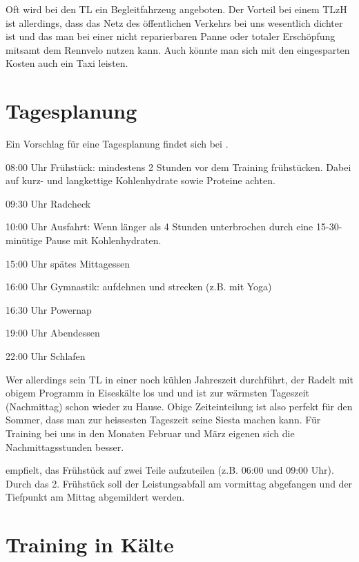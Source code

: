 \documentclass[a4paper,DIV13,BCOR0cm]{scrartcl}
\newcommand{\rv}{Rennvelo}
\newcommand{\tlzh}{TLzH}
\begin{document}
Oft wird bei den TL ein Begleitfahrzeug angeboten.
Der Vorteil bei einem \tlzh{} ist allerdings, dass das Netz des öffentlichen Verkehrs bei uns
wesentlich dichter ist und das man bei einer nicht reparierbaren Panne oder totaler Erschöpfung
mitsamt dem \rv{} nutzen kann. Auch könnte man sich mit den eingesparten Kosten auch ein Taxi leisten.

 

\section{Tagesplanung}

Ein Vorschlag für eine Tagesplanung findet sich bei .

\begin{itemize*}
  \item 08:00 Uhr Frühstück: mindestens 2 Stunden vor dem Training frühstücken.
    Dabei auf kurz- und langkettige Kohlenhydrate sowie Proteine achten.
  \item 09:30 Uhr Radcheck
  \item 10:00 Uhr Ausfahrt: Wenn länger als 4 Stunden unterbrochen durch eine 15-30-minütige Pause mit Kohlenhydraten.
  \item 15:00 Uhr spätes Mittagessen
  \item 16:00 Uhr Gymnastik: aufdehnen und strecken (z.B. mit Yoga)
  \item 16:30 Uhr Powernap
  \item 19:00 Uhr Abendessen
  \item 22:00 Uhr Schlafen
\end{itemize*}

Wer allerdings sein TL in einer noch kühlen Jahreszeit durchführt, der Radelt mit obigem Programm
in Eiseskälte los und und ist zur wärmsten Tageszeit (Nachmittag) schon wieder zu Hause.
Obige Zeiteinteilung ist also perfekt für den Sommer, dass man zur heissesten Tageszeit seine Siesta machen kann.
Für Training bei uns in den Monaten Februar und März eigenen sich die Nachmittagsstunden besser.

 empfielt, das Frühstück auf zwei
Teile aufzuteilen (z.B. 06:00 und 09:00 Uhr). Durch das 2. Frühstück
soll der Leistungsabfall am vormittag abgefangen und der Tiefpunkt am Mittag
abgemildert werden.


\section{Training in Kälte}
\end{document}
